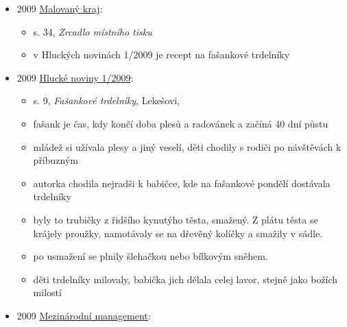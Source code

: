 \begin{itemize}
\begin{itemize}
    \begin{itemize}
    \tightlist
    \item
      s. 234: Moučníky \^{} Smažené moučníky TRDELNÍKY 150g polohrubé
      mouky, 60g másla, 60g krupicového cukru, 40g droždí, 4 žloutky, 3
    \item
      s. 237: TRDELNÍČKY 160 ml mléka, 30g cukru, 30g droždí
    \item
      s. 239: „TRDELNÍK`` NA PLECHU 250 ml mléka, 5 lžic cukru, 35 g
      droždí, 3 žloutky, 3 lžíce másla
    \end{itemize}
  \end{itemize}
\item
  2009
  \href{https://ndk.cz/uuid/uuid:81a73970-efc6-11e3-97c9-001018b5eb5c}{Malovaný
  kraj}:

  \begin{itemize}
  \tightlist
  \item
    s. 34, \emph{Zrcadlo místního tisku}
  \item
    v Hluckých novinách 1/2009 je recept na fašankové trdelníky
  \end{itemize}
\item
  2009
  \href{https://www.mestohluk.cz/modules/file_storage/download.php?file=817caa52\%7C38}{Hlucké
  noviny 1/2009}:

  \begin{itemize}
  \tightlist
  \item
    s. 9, \emph{Fašankové trdelníky}, Lekešovi, 
  \item
    fašank je čas, kdy končí doba plesů a radovánek a začíná 40 dní
    půstu
  \item
    mládež si užívala plesy a jiný veselí, děti chodily s rodiči po
    návštěvách k příbuzným
  \item
    autorka chodila nejradši k babičce, kde na fašankové pondělí
    dostávala trdelníky
  \item
    byly to trubičky z řidšího kynutýho těsta, smažený. Z plátu těsta se
    krájely proužky, namotávaly se na dřevěný kolíčky a smažily v sádle.
  \item
    po usmažení se plnily šlehačkou nebo bílkovým sněhem.
  \item
    děti trdelníky milovaly, babička jich dělala celej lavor, stejně
    jako božích milostí
  \end{itemize}
\item
  2009
  \href{https://www.digitalniknihovna.cz/mzk/uuid/uuid:f1fab870-f324-11e4-8936-005056827e51}{Mezinárodní
  management}:


\end{itemize}
